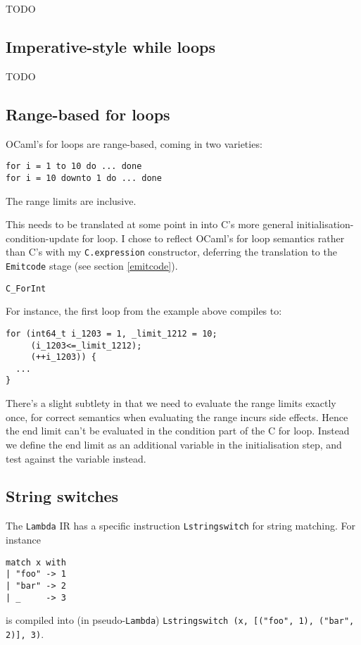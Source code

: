 \documentclass[12pt,a4paper,twoside,openright]{report}
\begin{document}
TODO

\subsection{Imperative-style while loops}\label{while-loops}

TODO

\subsection{Range-based for loops}\label{for-loops}

OCaml's for loops are range-based, coming in two varieties:
\begin{lstlisting}
for i = 1 to 10 do ... done
for i = 10 downto 1 do ... done
\end{lstlisting}

The range limits are inclusive.

This needs to be translated at some point in into C's more general
initialisation-condition-update for loop. I chose to reflect OCaml's for loop
semantics rather than C's with my \lstinline!C.expression!
constructor, deferring the translation to the \lstinline!Emitcode! stage (see
section \ref{emitcode}).

\lstinline!C_ForInt!

For instance, the first loop from the example above
compiles to:

\begin{lstlisting}
for (int64_t i_1203 = 1, _limit_1212 = 10;
     (i_1203<=_limit_1212);
     (++i_1203)) {
  ...
}
\end{lstlisting}

There's a slight subtlety in that we need to evaluate the range limits exactly
once, for correct semantics when evaluating the range incurs side effects.
Hence the end limit can't be evaluated in the condition part of the C for loop.
Instead we define the end limit as an additional variable in the initialisation
step, and test against the variable instead.

\subsection{String switches}\label{stringswitch}

The \lstinline!Lambda! IR has a specific instruction \lstinline!Lstringswitch!
for string matching. For instance
\begin{lstlisting}
match x with
| "foo" -> 1
| "bar" -> 2
| _     -> 3\end{lstlisting}
is compiled into (in pseudo-\lstinline!Lambda!)
\lstinline!Lstringswitch (x, [("foo", 1), ("bar", 2)], 3)!.
\end{document}
